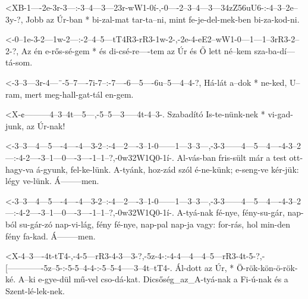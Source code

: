   {<XB-1----2e-3r-3---:-3--4---3---23r-wW1-0í-,-0----2--3--4---3---34zZ56uU6-:-4--3--2e--3y-?,}
  {    Jobb az Úr-ban * bi-zal-mat tar-ta--ni,  mint fe-je-del-mek-ben         bi-za-kod-ni.}

  {<-0--1e-3-2---1w-2---:-2--4--5---tT4R3-rR3-1w-2-,-2e-4-eE2--wW1-0---1---1--3rR3-2--2-?,}
  {  Az én e-rős-sé-gem * és di-csé-re----tem az Úr  és Ő lett né--kem sza-ba-dí---tá-som.}

  {<-3--3---3r-4---¨-5--7----7i-7--:-7----6---5----6u--5---4--4-?,}
  {  Há-lát a--dok * ne-ked, U--ram, mert meg-hall-gat-tál en-gem.}



  {<X-¢---------4--3--4t---5---,-5--5---3-----4t-4--3-.}
  {   Szabadító Is-te-nünk-nek * vi-gad-junk, az Úr-nak!}


  {<-3--3---4---5----4----4---3-2--:-4---2----3--1-0------1---3--3---,-3-3------4---5---4----4-3--2---:-4-2----3--1---0----3----1--1--?,-0w32W1Q0-1í-.}
  {  Al-vás-ban fris-sült már a test ott-hagy-va á-gyunk, fel-ke-lünk. A-tyánk, hoz-zád szól é-ne-künk; e-seng-ve kér-jük: légy ve-lünk. Á--------men.}


  {<-3--3---4---5----4----4---3-2--:-4---2----3--1-0------1---3--3---,-3-3------4---5---4----4-3--2---:-4-2----3--1---0----3----1--1--?,-0w32W1Q0-1í-.}
  {  A-tyá-nak fé-nye, fény-su-gár, nap-ból su-gár-zó nap-vi-lág, fény fé-nye, nap-pal nap-ja vagy: for-rás, hol min-den fény fa-kad. Á--------men.}

  {<X-4--3----4t-tT4-,-4-5---rR3-4-3---3-?,-5z-4-:-4-4---4---4--5---rR3-4t-5-?,-[-------------5z--5-:-5-5--4-4-:-5--5-4-----3--4t--tT4-.}
  {   Ál-dott az Úr, * Ö-rök-kön-ö-rök-ké.  A--ki  e-gye-dül mű-vel cso-dá-kat. Dicsőség_az_A-tyá-nak a Fi-ú-nak és a Szent-lé-lek-nek.}

